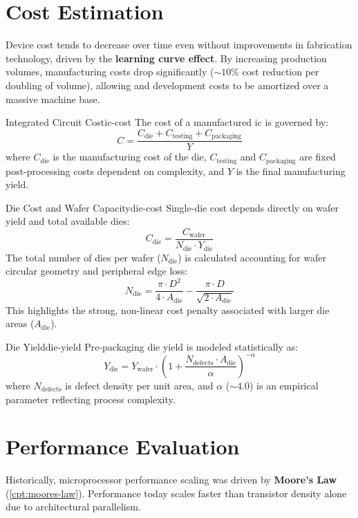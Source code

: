 \section{Cost Estimation}
Device cost tends to decrease over time even without improvements in fabrication technology, driven by the \textbf{learning curve effect}. By increasing production volumes, manufacturing costs drop significantly ($\sim 10\%$ cost reduction per doubling of volume), allowing  and development costs to be amortized over a massive machine base.

\begin{definition}{Integrated Circuit Cost}{ic-cost}
    The cost of a manufactured \gls{ic} is governed by:
    \[
        C = \frac{C_{\text{die}} + C_{\text{testing}} + C_{\text{packaging}}}{Y}
    \]
    where \(C_{\text{die}}\) is the manufacturing cost of the die, \(C_{\text{testing}}\) and \(C_{\text{packaging}}\) are fixed post-processing costs dependent on complexity, and \(Y\) is the final manufacturing yield.
\end{definition}

\begin{definition}{Die Cost and Wafer Capacity}{die-cost}
    Single-die cost depends directly on wafer yield and total available dies:
    \[
        C_{\text{die}} = \frac{C_{\text{wafer}}}{N_{\text{die}} \cdot Y_{\text{die}}}
    \]
    The total number of dies per wafer (\(N_{\text{die}}\)) is calculated accounting for wafer circular geometry and peripheral edge loss:
    \[
        N_{\text{die}} = \frac{\pi \cdot D^2}{4 \cdot A_{\text{die}}} - \frac{\pi \cdot D}{\sqrt{2 \cdot A_{\text{die}}}}
    \]
    This highlights the strong, non-linear cost penalty associated with larger die areas (\(A_{\text{die}}\)).
\end{definition}

\begin{definition}{Die Yield}{die-yield}
    Pre-packaging die yield is modeled statistically as:
    \[
        Y_{\text{die}} = Y_{\text{wafer}} \cdot \left(1 + \frac{N_{\text{defects}} \cdot A_{\text{die}}}{\alpha}\right)^{-\alpha}
    \]
    where \(N_{\text{defects}}\) is defect density per unit area, and \(\alpha\) ($\sim 4.0$) is an empirical parameter reflecting process complexity.
\end{definition}

\section{Performance Evaluation}
Historically, microprocessor performance scaling was driven by \textbf{Moore's Law} (\cref{cpt:moores-law}). Performance today scales faster than transistor density alone due to architectural parallelism.

